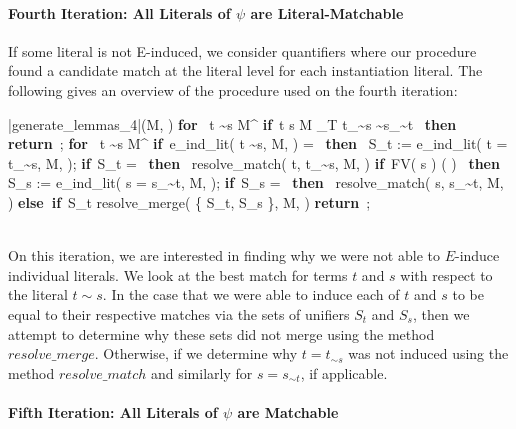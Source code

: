 \documentclass{llncs}
\def\IF{\qtab\keyword{if}\ }
\def\THEN{\ \keyword{then}\ }
\def\ELSEIF{\untab\qtab\keyword{else if}\ }
\def\FI{\untab}
\def\RETURN{\keyword{return}\ }
\def\ENDPROC{\untab}
\def\DOFOR{\qtab\keyword{for}\ }
\def\ENDFOR{\untab}
\def\keyword#1{\mbox{\normalshape\bf #1}}
\begin{document}
\paragraph{Fourth Iteration: All Literals of $\psi$ are Literal-Matchable}

If some literal is not E-induced, we consider quantifiers where our procedure found a candidate match at the literal level for each instantiation literal.
The following gives an overview of the procedure used on the fourth iteration:

\begin{minipage}[t]{.4\linewidth}
\begin{program}
\PROC |generate\_lemmas\_4|(M, \psi) \BODY
  \DOFOR {} t \sim s \in M^\psi
    \IF t  s  M \not\models_T t_{\sim s} \sim s_{\sim t} \THEN
      \RETURN;
    \FI
  \ENDFOR
  \DOFOR {} t \sim s \in M^\psi
    \IF e\_ind\_lit( t \sim s, M, \psi ) = \emptyset \THEN
      S_t := e\_ind\_lit( t = t_{\sim s}, M, \psi );
      \IF S_t = \emptyset \THEN
        resolve\_match( t, t_{\sim s}, M, \psi )
      \FI
      \IF FV( s ) \cap {}( \psi ) \neq \emptyset \THEN
        S_s := e\_ind\_lit( s = s_{\sim t}, M, \psi );
        \IF S_s = \emptyset \THEN
          resolve\_match( s, s_{\sim t}, M, \psi )
        \ELSEIF S_t \neq \emptyset
          resolve\_merge( \{ S_t, S_s \}, M, \psi )
        \FI
      \FI
    \FI
  \ENDFOR
  \RETURN;
\ENDPROC
\end{program}
\end{minipage}

\ \\

On this iteration, we are interested in finding why we were not able to $E$-induce individual literals.
We look at the best match for terms $t$ and $s$ with respect to the literal $t \sim s$.
In the case that we were able to induce each of $t$ and $s$ to be equal to their respective matches via the sets of unifiers $S_t$ and $S_s$, then we attempt to determine why these sets did not merge using the method $resolve\_merge$.
Otherwise, if we determine why $t = t_{\sim s}$ was not induced using the method $resolve\_match$ and similarly for $s = s_{\sim t}$, if applicable.

\paragraph{Fifth Iteration: All Literals of $\psi$ are Matchable}
\end{document}
